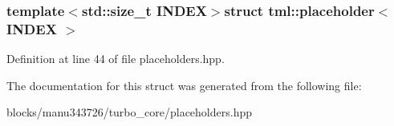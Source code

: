 \subsubsection*{template$<$std\+::size\+\_\+t I\+N\+D\+E\+X$>$struct tml\+::placeholder$<$ I\+N\+D\+E\+X $>$}



Definition at line 44 of file placeholders.\+hpp.



The documentation for this struct was generated from the following file\+:\begin{DoxyCompactItemize}
\item 
blocks/manu343726/turbo\+\_\+core/placeholders.\+hpp\end{DoxyCompactItemize}
